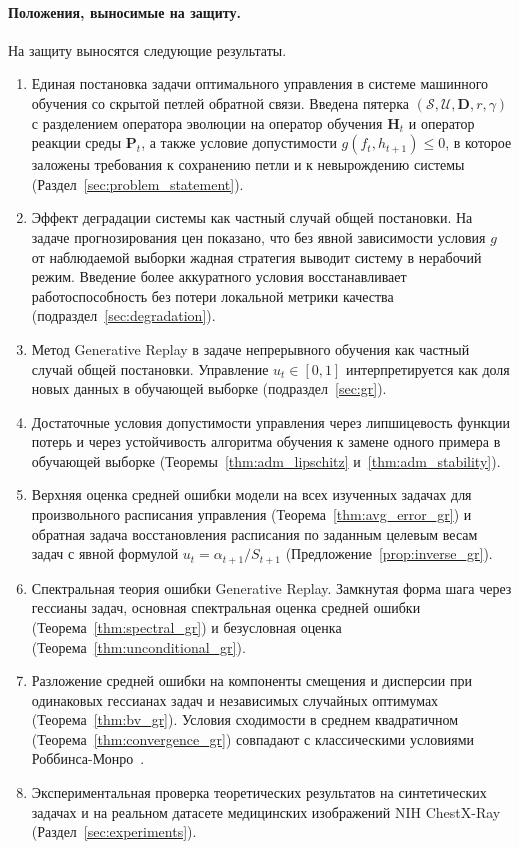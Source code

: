 \documentclass[a4paper,14pt,oneside,openany]{extarticle}
\newcommand{\bD}{\mathbf{D}}
\newcommand{\bH}{\mathbf{H}}
\newcommand{\bP}{\mathbf{P}}
\newcommand{\cS}{\mathcal{S}}
\newcommand{\cU}{\mathcal{U}}
\begin{document}
\paragraph{Положения, выносимые на защиту.}
На защиту выносятся следующие результаты.
\begin{enumerate}
    \item Единая постановка задачи оптимального управления в системе машинного обучения со скрытой петлей обратной связи. Введена пятерка $(\cS, \cU, \bD, r, \gamma)$ с разделением оператора эволюции на оператор обучения $\bH_t$ и оператор реакции среды $\bP_t$, а также условие допустимости $g(f_t, h_{t+1}) \le 0$, в которое заложены требования к сохранению петли и к невырождению системы (Раздел~\ref{sec:problem_statement}).
    \item Эффект деградации системы как частный случай общей постановки. На задаче прогнозирования цен показано, что без явной зависимости условия $g$ от наблюдаемой выборки жадная стратегия выводит систему в нерабочий режим. Введение более аккуратного условия восстанавливает работоспособность без потери локальной метрики качества (подраздел~\ref{sec:degradation}).
    \item Метод Generative Replay в задаче непрерывного обучения как частный случай общей постановки. Управление $u_t \in [0, 1]$ интерпретируется как доля новых данных в обучающей выборке (подраздел~\ref{sec:gr}).
    \item Достаточные условия допустимости управления через липшицевость функции потерь и через устойчивость алгоритма обучения к замене одного примера в обучающей выборке (Теоремы~\ref{thm:adm_lipschitz} и~\ref{thm:adm_stability}).
    \item Верхняя оценка средней ошибки модели на всех изученных задачах для произвольного расписания управления (Теорема~\ref{thm:avg_error_gr}) и обратная задача восстановления расписания по заданным целевым весам задач с явной формулой $u_t = \alpha_{t+1}/S_{t+1}$ (Предложение~\ref{prop:inverse_gr}).
    \item Спектральная теория ошибки Generative Replay. Замкнутая форма шага через гессианы задач, основная спектральная оценка средней ошибки (Теорема~\ref{thm:spectral_gr}) и безусловная оценка (Теорема~\ref{thm:unconditional_gr}).
    \item Разложение средней ошибки на компоненты смещения и дисперсии при одинаковых гессианах задач и независимых случайных оптимумах (Теорема~\ref{thm:bv_gr}). Условия сходимости в среднем квадратичном (Теорема~\ref{thm:convergence_gr}) совпадают с классическими условиями Роббинса-Монро~\cite{robbins1951stochastic}.
    \item Экспериментальная проверка теоретических результатов на синтетических задачах и на реальном датасете медицинских изображений NIH ChestX-Ray (Раздел~\ref{sec:experiments}).
\end{enumerate}
\end{document}
